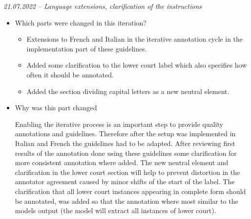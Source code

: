 \documentclass{article}
\begin{document}
\begin{mdframed}
\emph{21.07.2022 – Language extensions, clarification of the instructions}
\begin{itemize}
	\item Which parts were changed in this iteration? 
	\begin{itemize}
	    \item Extensions to French and Italian in the iterative annotation cycle in the implementation part of these guidelines.
	    \item Added some clarification to the lower court label which also specifies how often it should be annotated.
	    \item Added the section dividing capital letters as a new neutral element.
	    
	\end{itemize} 
    \item Why was this part changed
    
    Enabling the iterative process is an important step to provide quality annotations and guidelines. Therefore after the setup was implemented in Italian and French the guidelines had to be adapted. After reviewing first results of the annotation done using these guidelines some clarification for more consistent annotation where added. The new neutral element and clarification in the lower court section will help to prevent distortion in the annotator agreement caused by minor shifts of the start of the label. The clarification that all lower court instances appearing in complete form should be annotated, was added so that the annotation where most similar to the models output (the model will extract all instances of lower court).
\end{itemize}
\end{mdframed}


\pagebreak

\listoffigures
\end{document}
